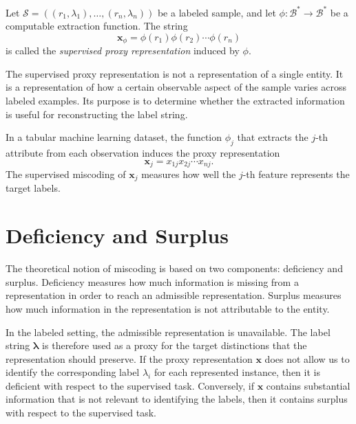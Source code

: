 \begin{definition}
\label{def:supervised_proxy_representation}
Let \(\mathcal S=((r_1,\lambda_1),\ldots,(r_n,\lambda_n))\) be a labeled sample, and let \(\phi:\mathcal B^\ast\to\mathcal B^\ast\) be a computable extraction function. The string
\[
    \mathbf{x}_{\phi}
    =
    \phi(r_1)\phi(r_2)\cdots \phi(r_n)
\]
is called the \emph{supervised proxy representation} induced by \(\phi\).
\end{definition}

The supervised proxy representation is not a representation of a single entity. It is a representation of how a certain observable aspect of the sample varies across labeled examples. Its purpose is to determine whether the extracted information is useful for reconstructing the label string.

\begin{example}
In a tabular machine learning dataset, the function \(\phi_j\) that extracts the \(j\)-th attribute from each observation induces the proxy representation
\[
    \mathbf{x}_j = x_{1j}x_{2j}\cdots x_{nj}.
\]
The supervised miscoding of \(\mathbf{x}_j\) measures how well the \(j\)-th feature represents the target labels.
\end{example}

%
%

\section{Deficiency and Surplus}
\label{sec:labeled_deficiency_surplus}

The theoretical notion of miscoding is based on two components: deficiency and surplus. Deficiency measures how much information is missing from a representation in order to reach an admissible representation. Surplus measures how much information in the representation is not attributable to the entity.

In the labeled setting, the admissible representation is unavailable. The label string $\boldsymbol{\lambda}$ is therefore used as a proxy for the target distinctions that the representation should preserve. If the proxy representation $\mathbf{x}$ does not allow us to identify the corresponding label $\lambda_i$ for each represented instance, then it is deficient with respect to the supervised task. Conversely, if $\mathbf{x}$ contains substantial information that is not relevant to identifying the labels, then it contains surplus with respect to the supervised task.

